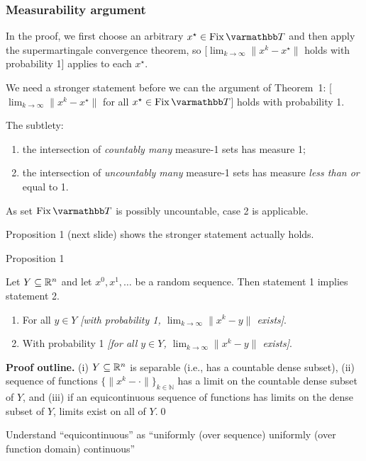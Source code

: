 \documentclass[10pt,mathserif]{beamer}
\begin{document}
\begin{frame}[plain]
\frametitle{Measurability argument}
In the proof, we first choose an arbitrary $x^\star\in \fix \opT$ and then apply the supermartingale convergence theorem, so [$\lim_{k\rightarrow\infty}\|x^k - x^\star\|$ holds with probability 1] applies to each $x^\star$.
\medskip

We need a stronger statement before we can the argument of Theorem~1: [$\lim_{k\rightarrow\infty}\|x^k - x^\star\|$ for all $x^\star\in \fix \opT$] holds with probability 1.
\medskip\pause

The subtlety: 
\begin{enumerate}
    \item the intersection of \emph{countably many} measure-1 sets has measure 1;
    \item the intersection of \emph{uncountably many} measure-1 sets has measure \emph{less than or} equal to 1.
\end{enumerate}
As set $\fix \opT$ is possibly uncountable, case 2 is applicable.
\medskip\pause

Proposition 1 (next slide) shows the stronger statement actually holds.
\end{frame}

\begin{frame}{Proposition 1}
\begin{proposition}\label{prp:prob1}
Let $Y\subseteq \mathbb{R}^n$ and let $x^0,x^1,\dots$ be a random sequence. Then statement 1 implies statement 2.
\begin{enumerate}
  \item For all $y\in Y$ \emph{[with probability 1, $\lim_{k\rightarrow\infty}\|x^k - y\|$ exists]}.
  \item With probability 1 \emph{[for all $y\in Y$, $\lim_{k\rightarrow\infty}\|x^k - y\|$ exists]}.
\end{enumerate}
\end{proposition}
\textbf{Proof outline.}
(i) $Y\subseteq \mathbb{R}^n$ is separable (i.e., has a countable dense subset), (ii) sequence of functions $\{\|x^k-\cdot \|\}_{k\in \mathbb{N}}$ has a limit on the countable dense subset of $Y$, and (iii) if an equicontinuous sequence of functions has limits on the dense subset of $Y$, limits exist on all of $Y$.\qed 
\medskip

Understand ``equicontinuous'' as ``uniformly (over sequence) uniformly (over function domain) continuous''
\end{frame}
\end{document}
